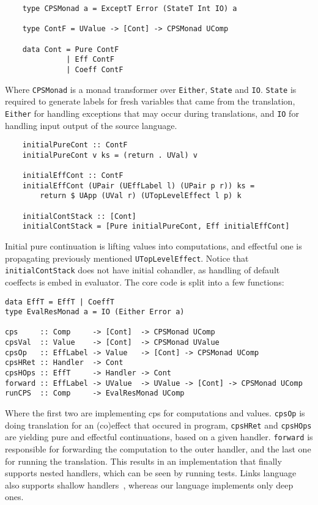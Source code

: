 \documentclass[declaration,shortabstract]{iithesis}
\theoremstyle{definition} \newtheorem{definition}{Definition}[chapter]
\theoremstyle{remark} \newtheorem{remark}[definition]{Observation}
\theoremstyle{plain} \newtheorem{theorem}[definition]{Theorem}
\theoremstyle{plain} \newtheorem{lemma}[definition]{Lemma}
\begin{document}
\begin{verbatim}
    type CPSMonad a = ExceptT Error (StateT Int IO) a

    type ContF = UValue -> [Cont] -> CPSMonad UComp

    data Cont = Pure ContF
              | Eff ContF
              | Coeff ContF
\end{verbatim}

    \noindent
    Where \verb!CPSMonad! is a monad transformer over \verb!Either!, \verb!State!
    and \verb!IO!. \verb!State! is required to generate labels for fresh variables
    that came from the translation, \verb!Either! for handling exceptions that
    may occur during translations, and \verb!IO! for handling input output of the
    source language.

\begin{verbatim}
    initialPureCont :: ContF
    initialPureCont v ks = (return . UVal) v

    initialEffCont :: ContF
    initialEffCont (UPair (UEffLabel l) (UPair p r)) ks =
        return $ UApp (UVal r) (UTopLevelEffect l p) k

    initialContStack :: [Cont]
    initialContStack = [Pure initialPureCont, Eff initialEffCont]
\end{verbatim}

    \noindent
    Initial pure continuation is lifting values into computations,
    and effectful one is propagating previously mentioned \verb!UTopLevelEffect!.
    Notice that \verb!initialContStack! does not have initial cohandler,
    as handling of default coeffects is embed in evaluator. The core code is
    split into a few functions:

\begin{verbatim}
data EffT = EffT | CoeffT
type EvalResMonad a = IO (Either Error a)

cps     :: Comp     -> [Cont]  -> CPSMonad UComp
cpsVal  :: Value    -> [Cont]  -> CPSMonad UValue
cpsOp   :: EffLabel -> Value   -> [Cont] -> CPSMonad UComp
cpsHRet :: Handler  -> Cont
cpsHOps :: EffT     -> Handler -> Cont
forward :: EffLabel -> UValue  -> UValue -> [Cont] -> CPSMonad UComp
runCPS  :: Comp     -> EvalResMonad UComp
\end{verbatim}

    \noindent
    Where the first two are implementing cps for computations and values.
    \verb!cpsOp! is doing translation for an (co)effect that occured in program,
    \verb!cpsHRet! and \verb!cpsHOps! are yielding pure and effectful continuations,
    based on a given handler. \verb!forward! is responsible for forwarding the
    computation to the outer handler, and the last one for running the
    translation. This results in an
    implementation that finally supports nested handlers, which can be seen by
    running tests. Links language~\cite{handlers-cps-journal} also supports
    shallow handlers~\cite{shallow-handlers}, whereas our language implements
    only deep ones.
\end{document}
